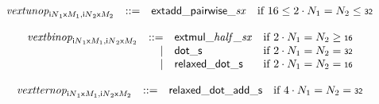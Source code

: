 $$
\begin{array}[t]{@{}lrrl@{}l@{}}
& {{\mathit{vextunop}}}_{{{{\mathsf{i}}{N}}_1}{\mathsf{x}}{M_1}, {{{\mathsf{i}}{N}}_2}{\mathsf{x}}{M_2}} & ::= & {\mathsf{extadd\_pairwise}}{\mathsf{\_}}{{\mathit{sx}}} & \quad \mbox{if}~ 16 \leq 2 \cdot N_1 = N_2 \leq \mathsf{{\scriptstyle 32}} \\
\end{array}
$$

$$
\begin{array}[t]{@{}lrrl@{}l@{}}
& {{\mathit{vextbinop}}}_{{{{\mathsf{i}}{N}}_1}{\mathsf{x}}{M_1}, {{{\mathsf{i}}{N}}_2}{\mathsf{x}}{M_2}} & ::= & {\mathsf{extmul}}{\mathsf{\_}}{{\mathit{half}}}{\mathsf{\_}}{{\mathit{sx}}} & \quad \mbox{if}~ 2 \cdot N_1 = N_2 \geq \mathsf{{\scriptstyle 16}} \\
& & | & {\mathsf{dot}}{\mathsf{\_}}{\mathsf{s}} & \quad \mbox{if}~ 2 \cdot N_1 = N_2 = \mathsf{{\scriptstyle 32}} \\
& & | & {\mathsf{relaxed\_dot}}{\mathsf{\_}}{\mathsf{s}} & \quad \mbox{if}~ 2 \cdot N_1 = N_2 = \mathsf{{\scriptstyle 16}} \\
\end{array}
$$

$$
\begin{array}[t]{@{}lrrl@{}l@{}}
& {{\mathit{vextternop}}}_{{{{\mathsf{i}}{N}}_1}{\mathsf{x}}{M_1}, {{{\mathsf{i}}{N}}_2}{\mathsf{x}}{M_2}} & ::= & {\mathsf{relaxed\_dot\_add}}{\mathsf{\_}}{\mathsf{s}} & \quad \mbox{if}~ 4 \cdot N_1 = N_2 = \mathsf{{\scriptstyle 32}} \\
\end{array}
$$

